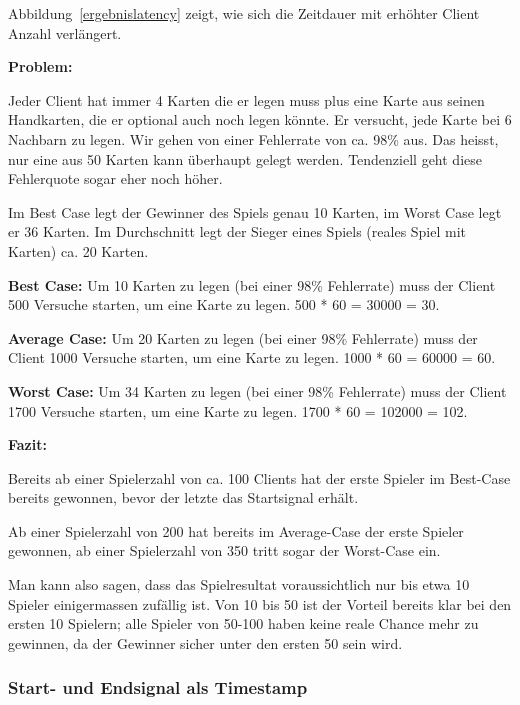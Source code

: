 Abbildung~\ref{ergebnislatency} zeigt, wie sich die Zeitdauer mit erhöhter Client Anzahl verlängert.
 
\textbf{Problem:}

Jeder Client hat immer 4 Karten die er legen muss plus eine Karte aus seinen Handkarten, die er optional auch noch legen könnte. Er versucht, jede Karte bei 6 Nachbarn zu legen. Wir gehen von einer Fehlerrate von ca. 98\% aus. Das heisst, nur eine aus 50 Karten kann überhaupt gelegt werden. Tendenziell geht diese Fehlerquote sogar eher noch höher.

Im Best Case legt der Gewinner des Spiels genau 10 Karten, im Worst Case legt er 36 Karten. Im Durchschnitt legt der Sieger eines Spiels (reales Spiel mit Karten) ca. 20 Karten. 

\textbf{Best Case:} Um 10 Karten zu legen (bei einer 98\% Fehlerrate) muss der Client 500 Versuche starten, um eine Karte zu legen. \unit{500} * \unit{60}{\micro\second} = \unit{30000}{\micro\second} = \unit{30}{\milli\second}.

\textbf{Average Case:} Um 20 Karten zu legen (bei einer 98\% Fehlerrate) muss der Client 1000 Versuche starten, um eine Karte zu legen. \unit{1000} * \unit{60}{\micro\second} = \unit{60000}{\micro\second} = \unit{60}{\milli\second}.

\textbf{Worst Case:} Um 34 Karten zu legen (bei einer 98\% Fehlerrate) muss der Client 1700 Versuche starten, um eine Karte zu legen. \unit{1700} * \unit{60}{\micro\second} = \unit{102000}{\micro\second} = \unit{102}{\milli\second}.

\textbf{Fazit:}

Bereits ab einer Spielerzahl von ca. 100 Clients hat der erste Spieler im Best-Case bereits gewonnen, bevor der letzte das Startsignal erhält.

Ab einer Spielerzahl von 200 hat bereits im Average-Case der erste Spieler gewonnen, ab einer Spielerzahl von 350 tritt sogar der Worst-Case ein.

Man kann also sagen, dass das Spielresultat voraussichtlich nur bis etwa 10 Spieler einigermassen zufällig ist. Von 10 bis 50 ist der Vorteil bereits klar bei den ersten 10 Spielern; alle Spieler von 50-100 haben keine reale Chance mehr zu gewinnen, da der Gewinner sicher unter den ersten 50 sein wird. 

\subsubsection{Start- und Endsignal als Timestamp}

